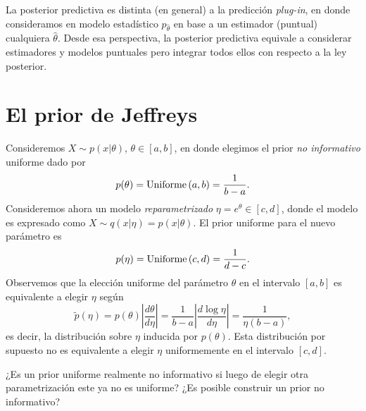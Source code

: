 \begin{remark}
La posterior predictiva es distinta (en general) a la predicción \emph{plug-in}, en donde consideramos en modelo estadístico $p_{\hat\theta}$ en base a un estimador (puntual) cualquiera $\hat\theta$. Desde esa perspectiva, la posterior predictiva equivale a considerar estimadores y modelos puntuales pero integrar todos ellos con respecto a la ley posterior. 
\end{remark}

\newpage


\section{El prior de Jeffreys}

Consideremos $X\sim p(x|\theta)$, $\theta \in [a,b]$, en donde elegimos el prior \textit{no informativo} uniforme dado por 
$$
	p(\theta) =\text{Uniforme}\left(a,b\right) = \frac{1}{b-a}.
$$
Consideremos ahora un modelo \textit{reparametrizado} $\eta = e^\theta\in[c,d]$, donde el modelo es expresado como $X\sim q(x|\eta) = p(x|\theta) $. El prior uniforme para el nuevo parámetro es
\begin{equation}
	p(\eta) =\text{Uniforme}\left(c,d\right) = \frac{1}{d-c}.
\end{equation}
Observemos que la elección uniforme del parámetro $\theta$ en el intervalo $[a,b]$ es equivalente a elegir $\eta$ según
\begin{equation}
	\tilde{p}(\eta) = p(\theta) \left|\frac{d\theta}{d\eta}\right| = \frac{1}{b-a}\left|\frac{d\log\eta}{d\eta}\right|= \frac{1}{\eta (b-a)},
\end{equation}
es decir, la distribución sobre $\eta$ inducida por $p(\theta)$. Esta distribución por supuesto no es equivalente a elegir $\eta$ uniformemente en el intervalo $[c,d]$. 

\begin{remark}
¿Es un prior uniforme realmente no informativo si luego de elegir otra parametrización este ya no es uniforme? ¿Es posible construir un prior no informativo?
\end{remark}

